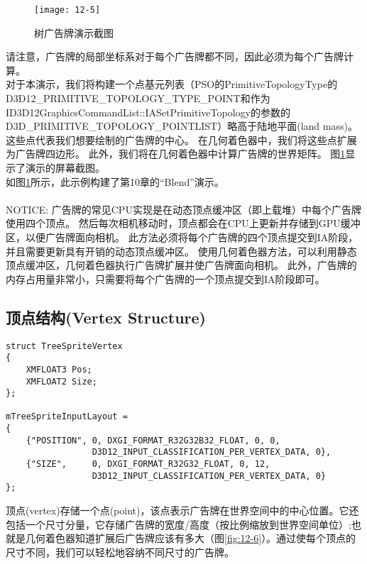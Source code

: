 \begin{figure}[h]
    \texttt{[image: 12-5]}
    \centering
    \caption{树广告牌演示截图}
    \label{fig:12-5}
\end{figure}

\begin{flushleft}
请注意，广告牌的局部坐标系对于每个广告牌都不同，因此必须为每个广告牌计算。\\

对于本演示，我们将构建一个点基元列表（PSO的PrimitiveTopologyType的D3D12\_PRIMITIVE\_TOPOLOGY\_TYPE\_POINT和作为ID3D12GraphicsCommandList::IASetPrimitiveTopology的参数的D3D\_PRIMITIVE\_TOPOLOGY\_POINTLIST）略高于陆地平面(land mass)。 这些点代表我们想要绘制的广告牌的中心。 在几何着色器中，我们将这些点扩展为广告牌四边形。 此外，我们将在几何着色器中计算广告牌的世界矩阵。 图\ref{fig:12-5}显示了演示的屏幕截图。\\

如图\ref{fig:12-5}所示，此示例构建了第10章的“Blend”演示。\\

~\\
NOTICE: 广告牌的常见CPU实现是在动态顶点缓冲区（即上载堆）中每个广告牌使用四个顶点。 然后每次相机移动时，顶点都会在CPU上更新并存储到GPU缓冲区，以便广告牌面向相机。 此方法必须将每个广告牌的四个顶点提交到IA阶段，并且需要更新具有开销的动态顶点缓冲区。 使用几何着色器方法，可以利用静态顶点缓冲区，几何着色器执行广告牌扩展并使广告牌面向相机。 此外，广告牌的内存占用量非常小，只需要将每个广告牌的一个顶点提交到IA阶段即可。
~\\
\end{flushleft}

\subsection{顶点结构(Vertex Structure)}
\begin{lstlisting}
struct TreeSpriteVertex
{
    XMFLOAT3 Pos;
    XMFLOAT2 Size;
};

mTreeSpriteInputLayout =
{
    {"POSITION", 0, DXGI_FORMAT_R32G32B32_FLOAT, 0, 0,
                 D3D12_INPUT_CLASSIFICATION_PER_VERTEX_DATA, 0},
    {"SIZE",     0, DXGI_FORMAT_R32G32_FLOAT, 0, 12,
                 D3D12_INPUT_CLASSIFICATION_PER_VERTEX_DATA, 0}
};
\end{lstlisting}

\begin{flushleft}
顶点(vertex)存储一个点(point)，该点表示广告牌在世界空间中的中心位置。它还包括一个尺寸分量，它存储广告牌的宽度/高度（按比例缩放到世界空间单位）;也就是几何着色器知道扩展后广告牌应该有多大（图\ref{fig:12-6}）。通过使每个顶点的尺寸不同，我们可以轻松地容纳不同尺寸的广告牌。\\
\end{flushleft}

